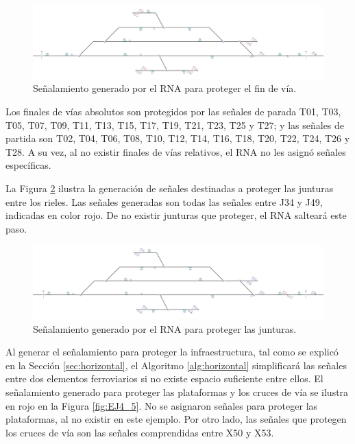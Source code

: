 \begin{figure}[H]
	\centering
	\includegraphics[width=1\textwidth]{resultados-obtenidos/ejemplo4/images/4_step1.png}
	\centering\caption{Señalamiento generado por el RNA para proteger el fin de vía.}
	\label{fig:EJ4_3}
\end{figure}

Los finales de vías absolutos son protegidos por las señales de parada T01, T03, T05, T07, T09, T11, T13, T15, T17, T19, T21, T23, T25 y T27; y las señales de partida son T02, T04, T06, T08, T10, T12, T14, T16, T18, T20, T22, T24, T26 y T28. A su vez, al no existir finales de vías relativos, el RNA no les asignó señales específicas.

La Figura \ref{fig:EJ4_4} ilustra la generación de señales destinadas a proteger las junturas entre los rieles. Las señales generadas son todas las señales entre J34 y J49, indicadas en color rojo. De no existir junturas que proteger, el RNA salteará este paso.

\begin{figure}[H]
	\centering
	\includegraphics[width=1\textwidth]{resultados-obtenidos/ejemplo4/images/4_step2.png}
	\centering\caption{Señalamiento generado por el RNA para proteger las junturas.}
	\label{fig:EJ4_4}
\end{figure}

Al generar el señalamiento para proteger la infraestructura, tal como se explicó en la Sección \ref{sec:horizontal}, el Algoritmo \ref{alg:horizontal} simplificará las señales entre dos elementos ferroviarios si no existe espacio suficiente entre ellos. El señalamiento generado para proteger las plataformas y los cruces de vía se ilustra en rojo en la Figura \ref{fig:EJ4_5}. No se asignaron señales para proteger las plataformas, al no existir en este ejemplo. Por otro lado, las señales que protegen los cruces de vía son las señales comprendidas entre X50 y X53.

